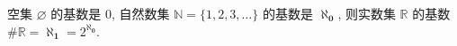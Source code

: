 \documentclass[nofonts]{ctexart}
\begin{document}
空集 $\varnothing$ 的基数是 $0$, 自然数集 $\mathbb{N} = \{1,2,3,\dots\}$ 
的基数是 $\bm{\aleph_0}$, 则实数集 $\mathbb{R}$ 的基数
$\#\mathbb{R} = \bm{\aleph_1} = 2^{\bm{\aleph_0}}$.
\end{document}
